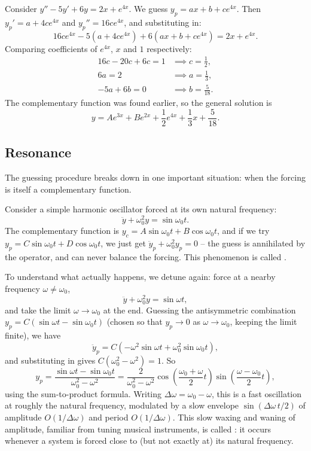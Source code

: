 \begin{example}
	Consider $y'' - 5y' + 6y = 2x + e^{4x}$. We guess $y_p = ax + b + ce^{4x}$. Then $y_p' = a + 4ce^{4x}$ and $y_p'' = 16 c e^{4x}$, and substituting in:
	$$
	16 c e^{4x} - 5(a + 4ce^{4x}) + 6(ax + b + ce^{4x}) = 2x + e^{4x}.
	$$
	Comparing coefficients of $e^{4x}$, $x$ and $1$ respectively:
	\begin{align*}
		16c - 20c + 6c = 1 &\implies c = \tfrac{1}{2}, \\
		6a = 2 &\implies a = \tfrac{1}{3}, \\
		-5a + 6b = 0 &\implies b = \tfrac{5}{18}.
	\end{align*}
	The complementary function was found earlier, so the general solution is
	$$
	y = A e^{3x} + B e^{2x} + \frac{1}{2}e^{4x} + \frac{1}{3}x + \frac{5}{18}.
	$$
\end{example}

\subsection{Resonance}

The guessing procedure breaks down in one important situation: when the forcing is itself a complementary function.

Consider a simple harmonic oscillator forced at its own natural frequency:
$$
\ddot{y} + \omega_0^2 y = \sin \omega_0 t.
$$
The complementary function is $y_c = A \sin \omega_0 t + B \cos \omega_0 t$, and if we try $y_p = C \sin \omega_0 t + D \cos \omega_0 t$, we just get $\ddot y_p + \omega_0^2 y_p = 0$ -- the guess is annihilated by the operator, and can never balance the forcing. This phenomenon is called .

To understand what actually happens, we detune again: force at a nearby frequency $\omega \neq \omega_0$,
$$
\ddot y + \omega_0^2 y = \sin \omega t,
$$
and take the limit $\omega \to \omega_0$ at the end. Guessing the antisymmetric combination $y_p = C(\sin \omega t - \sin \omega_0 t)$ (chosen so that $y_p \to 0$ as $\omega \to \omega_0$, keeping the limit finite), we have
$$
\ddot y_p = C(-\omega^2 \sin \omega t + \omega_0^2 \sin \omega_0 t),
$$
and substituting in gives $C(\omega_0^2 - \omega^2) = 1$. So
$$
y_p = \frac{\sin \omega t - \sin \omega_0 t}{\omega_0^2 - \omega^2} = \frac{2}{\omega_0^2 - \omega^2} \cos\left(\frac{\omega_0 + \omega}{2} t\right) \sin \left(\frac{\omega - \omega_0}{2}t\right),
$$
using the sum-to-product formula. Writing $\Delta \omega = \omega_0 - \omega$, this is a fast oscillation at roughly the natural frequency, modulated by a slow envelope $\sin(\Delta\omega \, t/2)$ of amplitude $O(1/\Delta \omega)$ and period $O(1/\Delta\omega)$. This slow waxing and waning of amplitude, familiar from tuning musical instruments, is called : it occurs whenever a system is forced close to (but not exactly at) its natural frequency.

